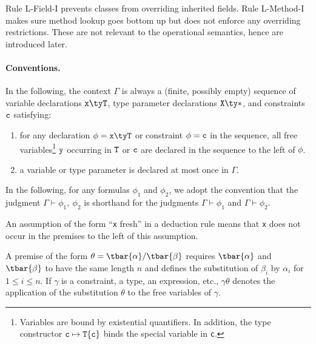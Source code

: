 Rule {\sc L-Field-I} prevents classes from overriding inherited fields. Rule {\sc L-Method-I} makes sure method lookup goes bottom up but does not enforce any overriding restrictions. These are not relevant to the operational semantics, hence are introduced later.

\paragraph{Conventions.}
In the following, the context $\Gamma$ is always a (finite, possibly empty) sequence of variable declarations $\tt x\ty T$, type parameter declarations $\tt X\ty*$, and constraints $\tt c$ satisfying:
\begin{enumerate}
  \item for any declaration $\phi=\tt x\ty T$ or constraint $\phi=\tt c$ in the sequence, all free variables\footnote{Variables are bound by existential quantifiers. In addition, the type constructor ${\tt c}\mapsto{\tt T}\{{\tt c}\}$ binds the special variable {\self} in {\tt c}.} $\tt y$ occurring in $\tt T$ or $\tt c$ are declared in the sequence to the left of $\phi$.

  \item a variable or type parameter is declared at most once in $\Gamma$.
\end{enumerate}

In the following, for any formulas $\phi_1$ and $\phi_2$, we adopt the convention that the judgment $\Gamma \vdash \phi_1,~\phi_2$ is shorthand for the judgments $\Gamma \vdash \phi_1$ and $\Gamma \vdash \phi_2$. 

An assumption of the form ``{\tt x} fresh'' in a deduction rule means that {\tt x} does not occur in the premises to the left of this assumption.

A premise of the form $\theta=\tbar{\alpha}/\tbar{\beta}$ requires $\tbar{\alpha}$ and $\tbar{\beta}$ to have the same length $n$ and defines the substitution of $\beta_i$ by $\alpha_i$ for $1\leq i\leq n$. If $\gamma$ is a constraint, a type, an expression, etc., $\gamma\theta$ denotes the application of the substitution $\theta$ to the free variables of $\gamma$.

